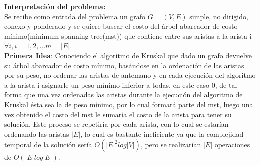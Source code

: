 \documentclass[12pt]{article}
\begin{document}
 
\textbf{Interpretaci\'on del problema:} \\

Se recibe como entrada del problema un grafo $G=(V,E)$ simple, no dirigido, conexo y ponderado y se quiere buscar el costo del \'arbol abarcador de costo m\'inimo(minimum spanning tree(mst))
 que contiene entre sus aristas a la arista i $\forall i, i = 1, 2,...m = |E|$.\\
 
\textbf{ Primera Idea}: Conociendo el algoritmo de Kruskal que dado un grafo devuelve su \'arbol abarcador de costo m\'inimo, bas\'andose en la ordenaci\'on de las aristas por 
su peso, no ordenar las aristas de antemano y en cada ejecuci\'on del algoritmo a
la arista i asignarle un peso m\'inimo inferior a todas, en este caso 0, de tal forma que una vez ordenadas las aristas durante la ejecuci\'on del algoritmo de Kruskal \'esta sea la de peso m\'inimo, por lo cual formar\'a parte del mst, luego una vez obtenido el costo del mst le sumar\'ia el costo de la arista para tener su soluci\'on. Este proceso se
repetir\'ia por cada arista, con lo cual se estar\'ian ordenando las aristas $|E|$, lo cual es bastante ineficiente ya que la complejidad temporal de la soluci\'on ser\'ia $O(|E|^2 log |V|)$, pero se realizar\'ian $|E|$ operaciones de $O(|E|log|E|)$.\\
\\
\end{document}
